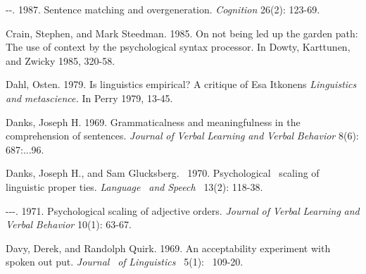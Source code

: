\begin{listWWNumixleveli}
\item 
\begin{styleStandard}
{}-{}-. 1987. Sentence matching and overgeneration. \textit{Cognition}\textit{ }26(2): 123-69.
\end{styleStandard}


\end{listWWNumixleveli}
\begin{styleStandard}
Crain, Stephen, and Mark Steedman. 1985. On not being led up the garden path: The use of context by the psychological syntax processor. In Dowty, Karttunen, and Zwicky 1985, 320-58.
\end{styleStandard}


\begin{styleStandard}
Dahl, Osten. 1979. Is linguistics empirical? A critique of Esa Itkonen{\textquotesingle}s \textit{Linguistics}\textit{ }\textit{and}\textit{ }\textit{metascience.}\textit{ }In Perry 1979, 13-45.
\end{styleStandard}


\begin{styleStandard}
Danks, Joseph H. 1969. Grammaticalness and meaningfulness in the comprehension of sentences. \textit{Journal}\textit{ }\textit{of}\textit{ }\textit{Verbal}\textit{ }\textit{Learning}\textit{ }\textit{and}\textit{ }\textit{Verbal}\textit{ }\textit{Behavior}\textit{ }8(6): 687:...96.
\end{styleStandard}


\clearpage\setcounter{page}{1}\begin{styleStandard}
Danks, Joseph H., and Sam Glucksberg. \ 1970. Psychological \ scaling of linguistic proper\- ties. \textit{Language }\textit{\ }\textit{and}\textit{ }\textit{Speech }\textit{\ }13(2): 118-38.
\end{styleStandard}


\begin{styleStandard}
{}-{}-{}-. 1971. Psychological scaling of adjective orders. \textit{Journal}\textit{ }\textit{of}\textit{ }\textit{Verbal}\textit{ }\textit{Learning}\textit{ }\textit{and}\textit{ }\textit{Verbal}\textit{ }\textit{Behavior}\textit{ }10(1): 63-67.
\end{styleStandard}


\begin{styleStandard}
Davy, Derek, and Randolph Quirk. 1969. An acceptability experiment with spoken out\- put. \textit{Journal }\textit{\ }\textit{of}\textit{ }\textit{Linguistics }\textit{\ }5(1): \ 109-20.
\end{styleStandard}


